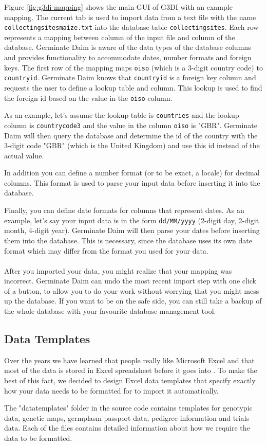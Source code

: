 \noindent Figure \ref{fig:g3di-mapping} shows the main GUI of G3DI with an example mapping. The current tab is used to import data from a text file with the name \texttt{collectingsites\textunderscore maize.txt} into the database table \texttt{collectingsites}. Each row represents a mapping between column of the input file and column of the database. Germinate Daim is aware of the data types of the database columns and provides functionality to accommodate dates, number formats and foreign keys. The first row of the mapping maps \texttt{oiso} (which is a 3-digit country code) to \texttt{country\textunderscore id}. Germinate Daim knows that \texttt{country\textunderscore id} is a foreign key column and requests the user to define a lookup table and column. This lookup is used to find the foreign id based on the value in the \texttt{oiso} column.

As an example, let's assume the lookup table is \texttt{countries} and the lookup column is \texttt{country\textunderscore code3} and the value in the column \texttt{oiso} is "GBR". Germinate Daim will then query the database and determine the id of the country with the 3-digit code "GBR" (which is the United Kingdom) and use this id instead of the actual value.

In addition you can define a number format (or to be exact, a locale) for decimal columns. This format is used to parse your input data before inserting it into the database.

Finally, you can define date formats for columns that represent dates. As an example, let's say your input data is in the form \texttt{dd/MM/yyyy} (2-digit day, 2-digit month, 4-digit year). Germinate Daim will then parse your dates before inserting them into the database. This is necessary, since the database uses its own date format which may differ from the format you used for your data.\\
\\
After you imported your data, you might realize that your mapping was incorrect. Germinate Daim can undo the most recent import step with one click of a button, to allow you to do your work without worrying that you might mess up the database. If you want to be on the safe side, you can still take a backup of the whole database with your favourite database management tool.

\subsection{{\germinate} Data Templates}
Over the years we have learned that people really like Microsoft Excel and that most of the data is stored in Excel spreadsheet before it goes into {\germinate}. To make the best of this fact, we decided to design Excel data templates that specify exactly how your data needs to be formatted for {\germinate} to import it automatically.

The "datatemplates" folder in the {\germinate} source code contains templates for genotypic data, genetic maps, germplasm passport data, pedigree information and trials data. Each of the files contains detailed information about how we require the data to be formatted.

